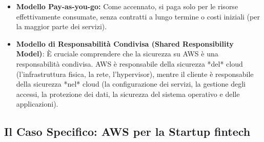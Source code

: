 \begin{itemize}
\begin{itemize}
        \end{itemize}
    \item \textbf{Modello Pay-as-you-go:} Come accennato, si paga solo per le risorse effettivamente consumate, senza contratti a lungo termine o costi iniziali (per la maggior parte dei servizi).
    \item \textbf{Modello di Responsabilità Condivisa (Shared Responsibility Model)}: È cruciale comprendere che la sicurezza su AWS è una responsabilità condivisa. AWS è responsabile della sicurezza *del* cloud (l'infrastruttura fisica, la rete, l'hypervisor), mentre il cliente è responsabile della sicurezza *nel* cloud (la configurazione dei servizi, la gestione degli accessi, la protezione dei dati, la sicurezza del sistema operativo e delle applicazioni).
\end{itemize}

\subsection{Il Caso Specifico: AWS per la Startup fintech}
\label{sec:aws-for-fintech}

